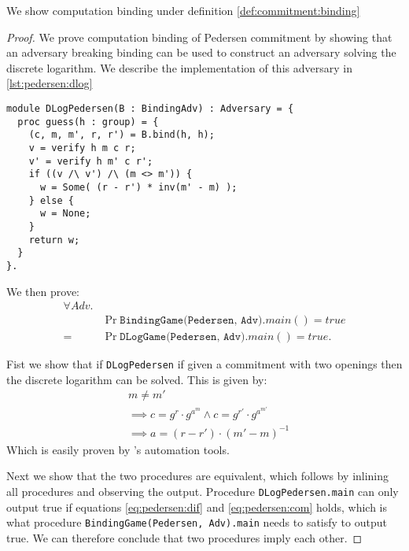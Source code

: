 \begin{lemma}
  We show computation binding under definition \ref{def:commitment:binding}
\end{lemma}
\begin{proof}
  We prove computation binding of Pedersen commitment by showing that an
  adversary breaking binding can be used to construct an adversary solving the
  discrete logarithm. We describe the implementation of this adversary in \autoref{lst:pedersen:dlog}

\begin{lstlisting}[label=lst:pedersen:dlog, caption=Discrete logarithm from
binding, float]
module DLogPedersen(B : BindingAdv) : Adversary = {
  proc guess(h : group) = {
    (c, m, m', r, r') = B.bind(h, h);
    v = verify h m c r;
    v' = verify h m' c r';
    if ((v /\ v') /\ (m <> m')) {
      w = Some( (r - r') * inv(m' - m) );
    } else {
      w = None;
    }
    return w;
  }
}.
\end{lstlisting}

  We then prove:
  \begin{align*}
    \forall Adv.& \\
    &\Pr{\texttt{BindingGame(Pedersen, Adv)}.main() = true} \\
    = &\Pr{\texttt{DLogGame(Pedersen, Adv)}.main() = true}.
  \end{align*}

  Fist we show that if \texttt{DLogPedersen} if given a commitment with two
  openings then the discrete logarithm can be solved. This is given by:
  \begin{align}
    &m \neq m' \label{eq:pedersen:dif}\\
    &\implies c = g^{r} \cdot g^{a^{m}} \land c = g^{r'} \cdot g^{a^{m'}} \label{eq:pedersen:com}\\
    &\implies a = (r - r') \cdot (m' - m)^{-1}
  \end{align}
  Which is easily proven by \easycrypt's automation tools.

  Next we show that the two procedures are equivalent, which follows by inlining
  all procedures and observing the output.
  Procedure \texttt{DLogPedersen.main} can only output true if equations
  \ref{eq:pedersen:dif} and \ref{eq:pedersen:com} holds, which is what procedure
  \texttt{BindingGame(Pedersen, Adv).main} needs to satisfy to output true. We
  can therefore conclude that two procedures imply each other.
\end{proof}

